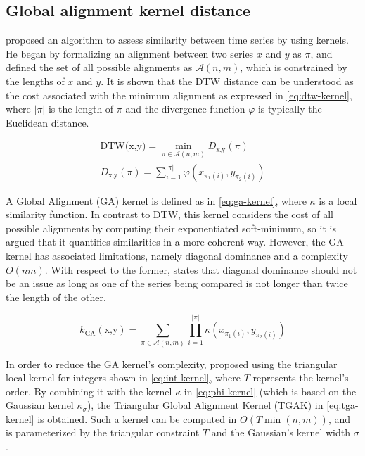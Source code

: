 \subsection{Global alignment kernel distance}
\label{sec:gak}

\citet{cuturi2011} proposed an algorithm to assess similarity between time series by using kernels.
He began by formalizing an alignment between two series $x$ and $y$ as $\pi$,
and defined the set of all possible alignments as $\mathcal{A}(n,m)$,
which is constrained by the lengths of $x$ and $y$.
It is shown that the DTW distance can be understood as the cost associated with the minimum alignment as expressed in \cref{eq:dtw-kernel},
where $|\pi|$ is the length of $\pi$ and the divergence function $\varphi$ is typically the Euclidean distance.

\begin{subequations}
\label{eq:dtw-kernel}
\begin{gather}
\text{DTW(x,y)} = \min_{\pi \in \mathcal{A}(n,m)} D_{\text{x,y}}(\pi) \\
D_{\text{x,y}}(\pi) = \sum_{i=1}^{|\pi|} \varphi \left( x_{\pi_1(i)}, y_{\pi_2(i)} \right)
\end{gather}
\end{subequations}

A Global Alignment (GA) kernel is defined as in \cref{eq:ga-kernel},
where $\kappa$ is a local similarity function.
In contrast to DTW,
this kernel considers the cost of all possible alignments by computing their exponentiated soft-minimum,
so it is argued that it quantifies similarities in a more coherent way.
However, the GA kernel has associated limitations,
namely diagonal dominance and a complexity $O(nm)$.
With respect to the former,
\citet{cuturi2011} states that diagonal dominance should not be an issue as long as one of the series being compared is not longer than twice the length of the other.

\begin{equation}
\label{eq:ga-kernel}
k_{\text{GA}}(\text{x,y}) = \sum_{\pi \in \mathcal{A}(n,m)} \prod_{i=1}^{|\pi|} \kappa \left( x_{\pi_1(i)}, y_{\pi_2(i)} \right)
\end{equation}

In order to reduce the GA kernel's complexity,
\citet{cuturi2011} proposed using the triangular local kernel for integers shown in \cref{eq:int-kernel},
where $T$ represents the kernel's order.
By combining it with the kernel $\kappa$ in \cref{eq:phi-kernel}
(which is based on the Gaussian kernel $\kappa_\sigma$),
the Triangular Global Alignment Kernel (TGAK) in \cref{eq:tga-kernel} is obtained.
Such a kernel can be computed in $O(T \min(n,m))$,
and is parameterized by the triangular constraint $T$ and the Gaussian's kernel width $\sigma$.


